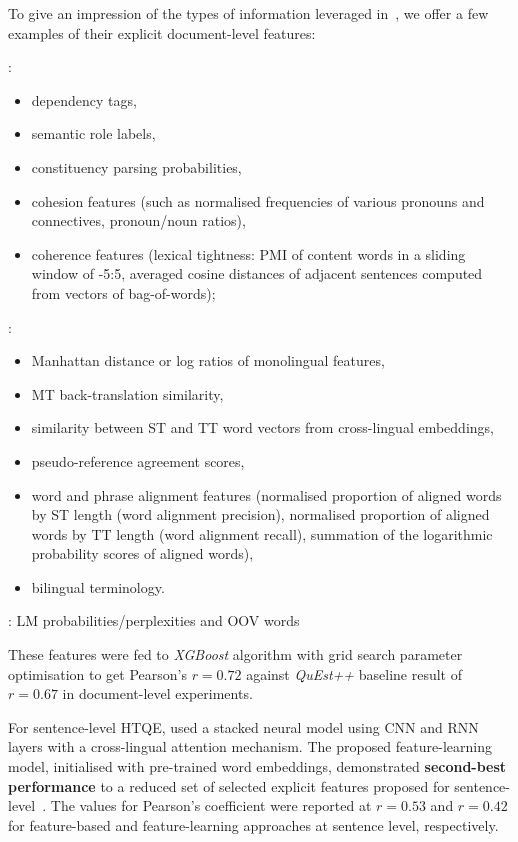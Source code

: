 To give an impression of the types of information leveraged in~\citet{Yuan2018}, we offer a few examples of their explicit document-level features:
\begin{description}\compresslist{}
	\item[monolingual]: 
	\begin{itemize}\compresslist{}
		\item dependency tags, 
		\item semantic role labels, 
		\item constituency parsing probabilities, 
		\item cohesion features (such as normalised frequencies of various pronouns and connectives, pronoun/noun ratios), 
		\item coherence features (lexical tightness: \gls{PMI} of content words in a sliding window of -5:5, averaged cosine distances of adjacent sentences computed from vectors of bag-of-words);
	\end{itemize}
	
	\item[bilingual]:
	\begin{itemize}\compresslist{}
		\item Manhattan distance or log ratios of monolingual features, 
		\item MT back-translation similarity,
		\item similarity between ST and TT word vectors from cross-lingual embeddings, 
		\item pseudo-reference agreement scores,
		\item word and phrase alignment features (normalised proportion of aligned words by ST length (word alignment precision), normalised proportion of aligned words by TT length (word alignment recall), summation of the logarithmic probability scores of aligned words),
		\item bilingual terminology.
	\end{itemize}
	\item[language modelling features]: LM probabilities/perplexities and \gls{OOV} words
\end{description} 

These features were fed to \textit{XGBoost} algorithm with grid search parameter optimisation to get Pearson's $r=0.72$ against \textit{QuEst++} baseline result of $r=0.67$ in document-level experiments.

For sentence-level \gls*{HTQE}, \citet{Yuan2018} used a stacked neural model using \gls{CNN} and \gls{RNN} layers with a cross-lingual attention mechanism.
The proposed feature-learning model, initialised with pre-trained word embeddings, demonstrated \textbf{second-best performance} to a reduced set of selected explicit features proposed for sentence-level~\cite[see Table 7.3 Sentence-level \gls*{HTQE} results in][p.160]{Yuan2018}. The values for Pearson's coefficient were reported at $r=0.53$ and $r=0.42$ for feature-based and feature-learning approaches at sentence level, respectively. 


